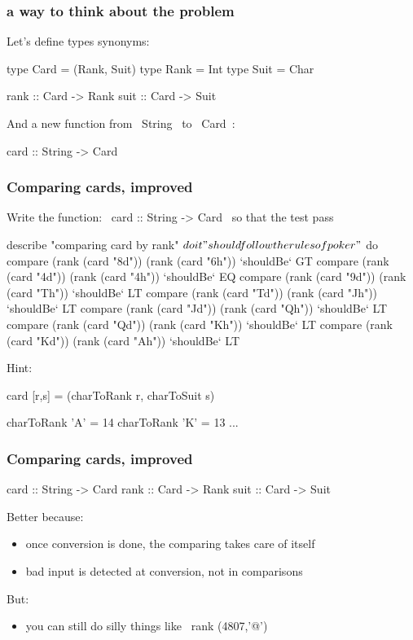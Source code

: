 \documentclass[11pt,xcolor={dvipsnames}]{beamer}
\begin{document}
\begin{frame}[fragile]
\frametitle{a way to think about the problem}
Let's define types synonyms:
\begin{haskell}
type Card = (Rank, Suit) 
type Rank = Int
type Suit = Char

rank :: Card -> Rank
suit :: Card -> Suit
\end{haskell}
And a new function from ~String~ to ~Card~:
\begin{haskell}
card :: String -> Card
\end{haskell}
\end{frame}
\begin{frame}[fragile]
\frametitle{Comparing cards, improved}
Write the function: ~card :: String -> Card~ 
so that the test pass
\begin{hspec}
describe "comparing card by rank" $ do
    it "should follow the rules of poker" $ do
        compare (rank (card "8d")) (rank (card "6h")) `shouldBe` GT
        compare (rank (card "4d")) (rank (card "4h")) `shouldBe` EQ
        compare (rank (card "9d")) (rank (card "Th")) `shouldBe` LT 
        compare (rank (card "Td")) (rank (card "Jh")) `shouldBe` LT 
        compare (rank (card "Jd")) (rank (card "Qh")) `shouldBe` LT 
        compare (rank (card "Qd")) (rank (card "Kh")) `shouldBe` LT 
        compare (rank (card "Kd")) (rank (card "Ah")) `shouldBe` LT 
\end{hspec}
Hint:
\begin{haskell}
card [r,s] = (charToRank r, charToSuit s)

charToRank 'A' = 14
charToRank 'K' = 13
...
\end{haskell}
\end{frame}
\begin{frame}[fragile]
\frametitle{Comparing cards, improved}
\begin{haskell}
card :: String -> Card
rank :: Card -> Rank
suit :: Card -> Suit
\end{haskell}
Better because:
\begin{itemize}
\item  once conversion is done, the comparing takes care of itself
\item  bad input is detected at conversion, not in comparisons
\end{itemize}
But:
\begin{itemize}
\item  you can still do silly things like ~rank (4807,'@')~ 
\end{itemize}
\end{frame}
\end{document}
